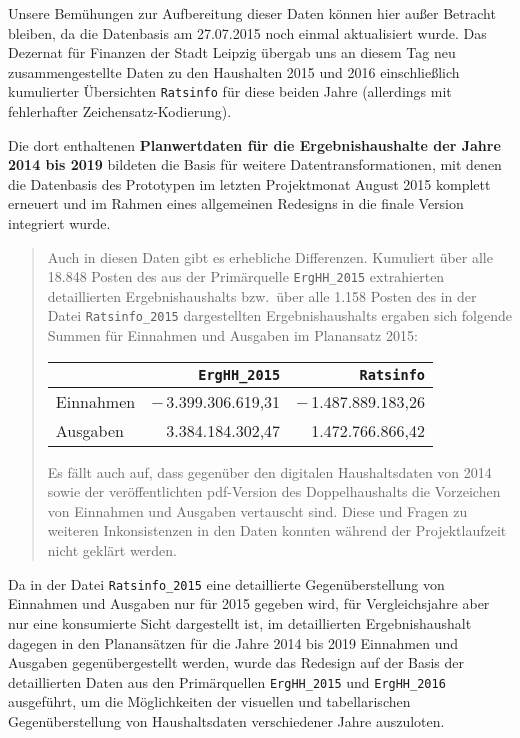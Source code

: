\documentclass[a4paper,11pt,twoside]{article}
\begin{document}
Unsere Bemühungen zur Aufbereitung dieser Daten können hier außer Betracht
bleiben, da die Datenbasis am 27.07.2015 noch einmal aktualisiert wurde.  Das
Dezernat für Finanzen der Stadt Leipzig übergab uns an diesem Tag neu
zusammengestellte Daten zu den Haushalten 2015 und 2016 einschließlich
kumulierter Übersichten \texttt{Ratsinfo} für diese beiden Jahre (allerdings
mit fehlerhafter Zeichensatz-Kodierung).  

Die dort enthaltenen \textbf{Planwertdaten für die Ergebnishaushalte der Jahre
  2014 bis 2019} bildeten die Basis für weitere Datentransformationen, mit
denen die Datenbasis des Prototypen im letzten Projektmonat August 2015
komplett erneuert und im Rahmen eines allgemeinen Redesigns in die finale
Version integriert wurde.
\begin{quote}
  Auch in diesen Daten gibt es erhebliche Differenzen.  Kumuliert über alle
  18.848 Posten des aus der Primärquelle \texttt{ErgHH\_2015} extrahierten
  detaillierten Ergebnishaushalts bzw.\ über alle 1.158 Posten des in der Datei
  \texttt{Ratsinfo\_2015} dargestellten Ergebnishaushalts ergaben sich folgende
  Summen für Einnahmen und Ausgaben im Planansatz 2015:
  \begin{center}
    \begin{tabular}{l|r|r}
      & \texttt{ErgHH\_2015}& \texttt{Ratsinfo}\\\hline
      Einnahmen & $-$\,3.399.306.619,31 & $-$\,1.487.889.183,26 \\
      Ausgaben & 3.384.184.302,47 & 1.472.766.866,42
    \end{tabular}
  \end{center}
Es fällt auch auf, dass gegenüber den digitalen Haushaltsdaten von 2014 sowie
der veröffentlichten pdf-Version des Doppelhaushalts die Vorzeichen von
Einnahmen und Ausgaben vertauscht sind. Diese und Fragen zu weiteren
Inkonsistenzen in den Daten konnten während der Projektlaufzeit nicht geklärt
werden. 
\end{quote}

Da in der Datei \texttt{Ratsinfo\_2015} eine detaillierte Gegenüberstellung von
Einnahmen und Ausgaben nur für 2015 gegeben wird, für Vergleichsjahre aber nur
eine konsumierte Sicht dargestellt ist, im detaillierten Ergebnishaushalt
dagegen in den Planansätzen für die Jahre 2014 bis 2019 Einnahmen und Ausgaben
gegenübergestellt werden, wurde das Redesign auf der Basis der detaillierten
Daten aus den Primärquellen \texttt{ErgHH\_2015} und \texttt{ErgHH\_2016}
ausgeführt, um die Möglichkeiten der visuellen und tabellarischen
Gegenüberstellung von Haushaltsdaten verschiedener Jahre auszuloten.
\end{document}
